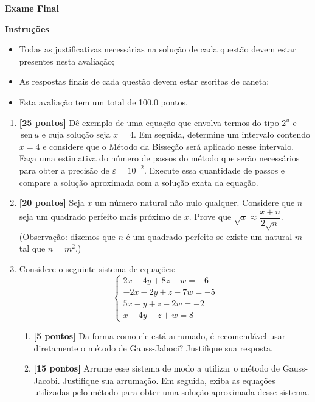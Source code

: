 \documentclass[10pt,a4paper]{article}
\newcommand{\sen}{\,\textrm{sen}\,}
\begin{document}
\begin{center}
 \textbf{Exame Final}
\end{center}

\textbf{Instruções}
\begin{itemize}
 \item Todas as justificativas necessárias na solução de cada questão devem estar presentes nesta avaliação;
 \item As respostas finais de cada questão devem estar escritas de caneta;
 \item Esta avaliação tem um total de 100,0 pontos.
\end{itemize}

\begin{enumerate}

 \item \textbf{[25 pontos]} Dê exemplo de uma equação que envolva termos do tipo $2^u$ e $\sen u$ e cuja solução seja $x = 4$. Em seguida, determine um intervalo 
contendo $x = 4$ e considere que o Método da Bisseção será aplicado nesse intervalo. Faça uma estimativa do número de passos do método que 
serão necessários para obter a precisão de $\varepsilon = 10^{-2}$. Execute essa quantidade de passos e compare a solução aproximada com a solução 
exata da equação.

 \item \textbf{[20 pontos]} Seja $x$ um número natural não nulo qualquer. Considere que $n$ seja um quadrado perfeito mais próximo de $x$. Prove que $\sqrt{x}\approx \dfrac{x+n}{2\sqrt{n}}$. 
 (Observação: dizemos que $n$ é um quadrado perfeito se existe um natural $m$ tal que $n = m^2$.)

 \item Considere o seguinte sistema de equações:
  $$%
   \begin{cases}
    2x - 4y + 8z  - w = -6 \\
    -2x  - 2y + z - 7w = -5 \\
    5x  - y + z - 2w = -2 \\
    x - 4y - z + w = 8
   \end{cases}
  $$

  \begin{enumerate}
   \item \textbf{[5 pontos]} Da forma como ele está arrumado, é recomendável usar diretamente o método de Gauss-Jaboci? Justifique sua resposta.
   \item \textbf{[15 pontos]} Arrume esse sistema de modo a utilizar o método de Gauss-Jacobi. Justifique sua arrumação. Em seguida, exiba as equações 
         utilizadas pelo método para obter uma solução aproximada desse sistema.
  \end{enumerate}
 

\end{enumerate}
\end{document}
